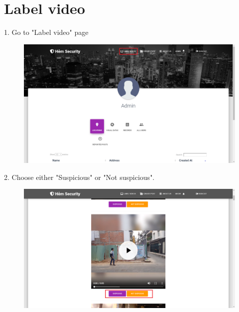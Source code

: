 \section{Label video}
1. Go to "Label video" page
\begin{center}
    \begin{figure}[H]
    \centering
    \includegraphics[width=1\columnwidth]{images/chap6/instruction5.png}
    \end{figure}
\end{center}
2. Choose either "Suspicious" or "Not suspicious". 
\begin{center}
    \begin{figure}[H]
    \centering
    \includegraphics[width=1\columnwidth]{images/chap6/instruction6.png}
    \end{figure}
\end{center}

